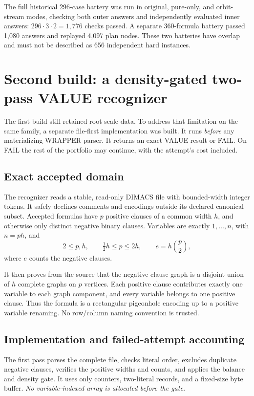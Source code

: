 \documentclass[11pt]{article}
\begin{document}
The full historical 296-case battery was run in original, pure-only, and orbit-stream modes, checking both outer answers and independently evaluated inner answers: $296\cdot3\cdot2=1,776$ checks passed. A separate 360-formula battery passed 1,080 answers and replayed 4,097 plan nodes. These two batteries have overlap and must not be described as 656 independent hard instances.

\section{Second build: a density-gated two-pass VALUE recognizer}
The first build still retained root-scale data. To address that limitation on the same family, a separate file-first implementation was built. It runs \emph{before} any materializing WRAPPER parser. It returns an exact VALUE result or FAIL. On FAIL the rest of the portfolio may continue, with the attempt's cost included.

\subsection{Exact accepted domain}
The recognizer reads a stable, read-only DIMACS file with bounded-width integer tokens. It safely declines comments and encodings outside its declared canonical subset. Accepted formulas have $p$ positive clauses of a common width $h$, and otherwise only distinct negative binary clauses. Variables are exactly $1,\ldots,n$, with $n=ph$, and
\[
 2\le p,h,\qquad \tfrac12h\le p\le2h,
 \qquad e=h\binom p2,
\]
where $e$ counts the negative clauses.

It then proves from the source that the negative-clause graph is a disjoint union of $h$ complete graphs on $p$ vertices. Each positive clause contributes exactly one variable to each graph component, and every variable belongs to one positive clause. Thus the formula is a rectangular pigeonhole encoding up to a positive variable renaming. No row/column naming convention is trusted.

\subsection{Implementation and failed-attempt accounting}
The first pass parses the complete file, checks literal order, excludes duplicate negative clauses, verifies the positive widths and counts, and applies the balance and density gate. It uses only counters, two-literal records, and a fixed-size byte buffer. \emph{No variable-indexed array is allocated before the gate.}
\end{document}
